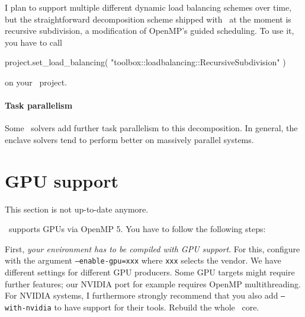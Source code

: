 I plan to support multiple different dynamic load balancing schemes over time,
but the straightforward decomposition scheme shipped with \Peano\ at the moment
is recursive subdivision, a modification of OpenMP's guided scheduling.
To use it, you have to call
\begin{code}
project.set_load_balancing( "toolbox::loadbalancing::RecursiveSubdivision" )
\end{code}

\noindent
on your \ExaHyPE\ project. 


\paragraph{Task parallelism}

Some \ExaHyPE\ solvers add further task parallelism to this decomposition. 
In general, the enclave solvers tend to perform better on massively parallel
systems.


% 


\section{GPU support}


\begin{remark}
 This section is not up-to-date anymore.
\end{remark}


\ExaHyPE\ supports GPUs via OpenMP 5.
You have to follow the following steps:


First, \emph{your environment has to be compiled with GPU support}.
For this, configure with the argument \texttt{--enable-gpu=xxx} where
\texttt{xxx} selects the vendor.
We have different settings for different GPU producers.
Some GPU targets might require further features; our NVIDIA port for example
requires OpenMP multithreading.
For NVIDIA systems, I furthermore strongly
recommend that you also add \texttt{--with-nvidia} to have support for their tools.
Rebuild the whole \Peano\ core.


